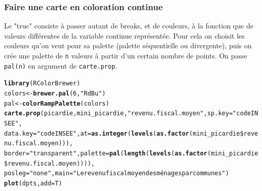 \documentclass[slidetop, 10pt]{beamer}\usepackage{graphicx, color}
\makeatletter
\newcommand{\hlfunctioncall}[1]{\textcolor[rgb]{0.501960784313725,0,0.329411764705882}{\textbf{#1}}}%
\newcommand{\hlstring}[1]{\textcolor[rgb]{0.6,0.6,1}{#1}}%
\newenvironment{kframe}{%
 \def\at@end@of@kframe{}%
 \ifinner\ifhmode%
  \def\at@end@of@kframe{\end{minipage}}%
  \begin{minipage}{\columnwidth}%
 \fi\fi%
 \def\FrameCommand##1{\hskip\@totalleftmargin \hskip-\fboxsep
 \colorbox{shadecolor}{##1}\hskip-\fboxsep
     \hskip-\linewidth \hskip-\@totalleftmargin \hskip\columnwidth}%
 \MakeFramed {\advance\hsize-\width
   \@totalleftmargin\z@ \linewidth\hsize
   \@setminipage}}%
 {\par\unskip\endMakeFramed%
 \at@end@of@kframe}
\newenvironment{knitrout}{}{} %
\renewenvironment{knitrout}{\begin{tiny}}{\end{tiny}}
\makeatother
\begin{document}
\begin{frame}[fragile]
\frametitle{Faire une carte en coloration continue}

Le "truc" consiste à passer autant de breaks, et de couleurs, à la fonction que de valeurs différentes de la variable continue représentée. Pour cela on choisit les couleurs qu'on veut pour sa palette (palette séquentielle ou divergente), puis on crée une palette de \verb!n! valeurs à partir d'un certain nombre de points. On passe \verb!pal(n)! en argument de \verb!carte.prop!.

\begin{knitrout}\tiny
{}\color{fgcolor}\begin{kframe}
\begin{alltt}
\hlfunctioncall{library}(RColorBrewer)
colors <- \hlfunctioncall{brewer.pal}(6, \hlstring{"RdBu"})
pal <- \hlfunctioncall{colorRampPalette}(colors)
\hlfunctioncall{carte.prop}(picardie, mini_picardie, \hlstring{"revenu.fiscal.moyen"}, sp.key = \hlstring{"codeINSEE"}, 
    data.key = \hlstring{"codeINSEE"}, at = \hlfunctioncall{as.integer}(\hlfunctioncall{levels}(\hlfunctioncall{as.factor}(mini_picardie\$revenu.fiscal.moyen))), 
    border = \hlstring{"transparent"}, palette = \hlfunctioncall{pal}(\hlfunctioncall{length}(\hlfunctioncall{levels}(\hlfunctioncall{as.factor}(mini_picardie\$revenu.fiscal.moyen)))), 
    posleg = \hlstring{"none"}, main = \hlstring{"Le revenu fiscal moyen des ménages par communes"})
\hlfunctioncall{plot}(dpts, add = T)
\end{alltt}
\end{kframe}
\end{knitrout}

\end{frame}
\end{document}
